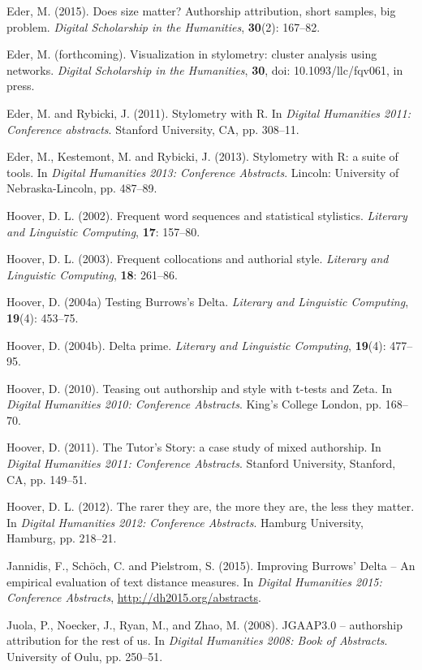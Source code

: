 \documentclass[11pt,a4paper]{article}
\begin{document}
Eder, M. (2015). Does size matter? Authorship attribution, short samples,
big problem. \textit{Digital Scholarship in the Humanities}, \textbf{30}(2):
167--82.

Eder, M. (forthcoming). Visualization in stylometry: cluster analysis 
using networks. \textit{Digital Scholarship in the Humanities}, 
\textbf{30}, doi: 10.1093/llc/fqv061, in press.

Eder, M. and Rybicki, J. (2011). Stylometry with R. In \textit{Digital
Humanities 2011: Conference abstracts}. Stanford University, CA, pp.
308--11.

Eder, M., Kestemont, M. and Rybicki, J. (2013). Stylometry with R: a suite 
of tools. In \textit{Digital Humanities 2013: Conference Abstracts}. 
Lincoln: University of Nebraska-Lincoln, pp. 487--89.

Hoover, D. L. (2002). Frequent word sequences and statistical stylistics.
\textit{Literary and Linguistic Computing}, \textbf{17}: 157--80.

Hoover, D. L. (2003). Frequent collocations and authorial style. 
\textit{Literary and Linguistic Computing}, \textbf{18}: 261--86.

Hoover, D. (2004a) Testing Burrows’s Delta. \textit{Literary and Linguistic
Computing}, \textbf{19}(4): 453--75.

Hoover, D. (2004b). Delta prime. \textit{Literary and Linguistic Computing},
\textbf{19}(4): 477--95.

Hoover, D. (2010). Teasing out authorship and style with t-tests and
Zeta. In \textit{Digital Humanities 2010: Conference Abstracts}. King's
College London, pp. 168--70.

Hoover, D. (2011). The Tutor's Story: a case study of mixed authorship.
In \textit{Digital Humanities 2011: Conference Abstracts}. Stanford
University, Stanford, CA, pp. 149--51.

Hoover, D. L. (2012). The rarer they are, the more they are, the less
they matter. In \textit{Digital Humanities 2012: Conference Abstracts}.
Hamburg University, Hamburg, pp. 218--21.

Jannidis, F., Sch\"och, C. and Pielstrom, S. (2015). Improving Burrows’ 
Delta – An empirical evaluation of text distance measures. In
\textit{Digital Humanities 2015: Conference Abstracts}, 
\url{http://dh2015.org/abstracts}.

Juola, P., Noecker, J., Ryan, M., and Zhao, M. (2008). JGAAP3.0 --
authorship attribution for the rest of us. In \textit{Digital Humanities
2008: Book of Abstracts}. University of Oulu, pp. 250--51.
\end{document}
